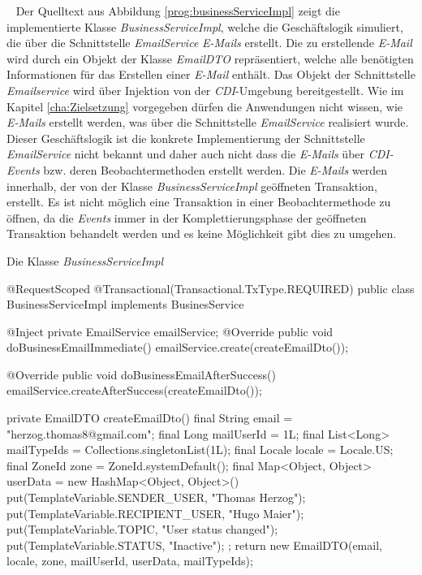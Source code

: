 \ \newline
Der Quelltext aus Abbildung \ref{prog:businessServiceImpl} zeigt die implementierte Klasse \emph{BusinessServiceImpl}, welche die Geschäftslogik simuliert, die über die Schnittstelle \emph{EmailService} \emph{E-Mails} erstellt. Die zu erstellende \emph{E-Mail} wird durch ein Objekt der Klasse \emph{EmailDTO} repräsentiert, welche alle benötigten Informationen für das Erstellen einer \emph{E-Mail} enthält. Das Objekt der Schnittstelle \emph{Emailservice} wird über Injektion von der \emph{CDI}-Umgebung bereitgestellt. Wie im Kapitel \ref{cha:Zielsetzung} vorgegeben dürfen die Anwendungen nicht wissen, wie \emph{E-Mails} erstellt werden, was über die Schnittstelle \emph{EmailService} realisiert wurde. Dieser Geschäftslogik ist die konkrete Implementierung der Schnittstelle \emph{EmailService} nicht bekannt und daher auch nicht dass die \emph{E-Mails} über \emph{CDI-Events} bzw. deren Beobachtermethoden erstellt werden.
\newline
\newline
Die \emph{E-Mails} werden innerhalb, der von der Klasse \emph{BusinessServiceImpl} geöffneten Transaktion, erstellt. Es ist nicht möglich eine Transaktion in einer Beobachtermethode zu öffnen, da die \emph{Events} immer in der Komplettierungsphase der geöffneten Transaktion behandelt werden und es keine Möglichkeit gibt dies zu umgehen.
\newpage
\begin{program}[h]
\caption{Die Klasse \emph{BusinessServiceImpl}}
\label{prog:businessServiceImpl}
\begin{JavaCode}
@RequestScoped
@Transactional(Transactional.TxType.REQUIRED)
public class BusinessServiceImpl implements BusinesService {
    @Inject
    private EmailService emailService;
    @Override
    public void doBusinessEmailImmediate() {
        emailService.create(createEmailDto());
    }

    @Override
    public void doBusinessEmailAfterSuccess() {
        emailService.createAfterSuccess(createEmailDto());
    }

    private EmailDTO createEmailDto() {
        final String email = "herzog.thomas8@gmail.com";
        final Long mailUserId = 1L;
        final List<Long> mailTypeIds = Collections.singletonList(1L);
        final Locale locale = Locale.US;
        final ZoneId zone = ZoneId.systemDefault();
        final Map<Object, Object> userData = 
        	new HashMap<Object, Object>() {{
                put(TemplateVariable.SENDER_USER, "Thomas Herzog");
                put(TemplateVariable.RECIPIENT_USER, "Hugo Maier");
                put(TemplateVariable.TOPIC, "User status changed");
                put(TemplateVariable.STATUS, "Inactive");
            }};
        return new EmailDTO(email, 
        					locale, 
        					zone, 
        					mailUserId, 
        					userData, 
        					mailTypeIds);
    }
}
\end{JavaCode}
\end{program}
